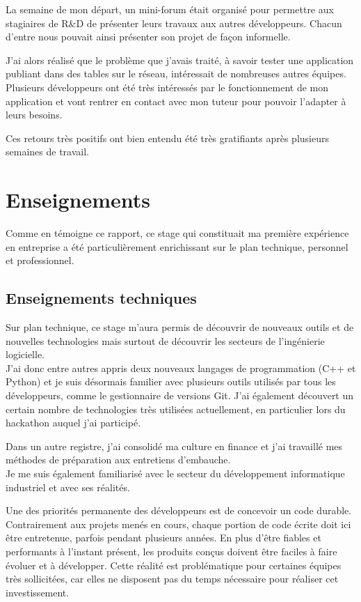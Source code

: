 \documentclass[11pt, oneside, titlepage, a4paper]{article}
\begin{document}
La semaine de mon départ, un mini-forum était organisé pour permettre aux stagiaires de R\&D de présenter leurs travaux aux autres développeurs. Chacun d'entre nous pouvait ainsi présenter son projet de façon informelle.

J'ai alors réalisé que le problème que j'avais traité, à savoir tester une application publiant dans des tables sur le réseau, intéressait de nombreuses autres équipes. Plusieurs développeurs ont été très intéressés par le fonctionnement de mon application et vont rentrer en contact avec mon tuteur pour pouvoir l'adapter à leurs besoins.

Ces retours très positifs ont bien entendu été très gratifiants après plusieurs semaines de travail.
\newpage
\section{Enseignements}
Comme en témoigne ce rapport, ce stage qui constituait ma première expérience en entreprise a été particulièrement enrichissant sur le plan technique, personnel et professionnel. 
	\subsection{Enseignements techniques}
Sur plan technique, ce stage m'aura permis de découvrir de nouveaux outils et de nouvelles technologies mais surtout de découvrir les secteurs de l'ingénierie logicielle.
\\

J'ai donc entre autres appris deux nouveaux langages de programmation (C++ et Python) et je suis désormais familier avec plusieurs outils utilisés par tous les développeurs, comme le gestionnaire de versions Git. J'ai également découvert un certain nombre de technologies très utilisées actuellement, en particulier lors du hackathon auquel j'ai participé.

Dans un autre registre, j'ai consolidé ma culture en finance et j'ai travaillé mes méthodes de préparation aux entretiens d'embauche.
\\

Je me suis également familiarisé avec le secteur du développement informatique industriel et avec ses réalités.

Une des priorités permanente des développeurs est de concevoir un code durable. Contrairement aux projets menés en cours, chaque portion de code écrite doit ici être entretenue, parfois pendant plusieurs années. En plus d'être fiables et performants à l'instant présent, les produits conçus doivent être faciles à faire évoluer et à développer. Cette réalité est problématique pour certaines équipes très sollicitées, car elles ne disposent pas du temps nécessaire pour réaliser cet investissement.
\\
\end{document}
